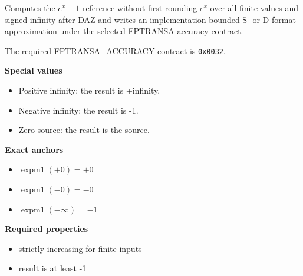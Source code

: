 Computes the $e^x - 1$ reference without first rounding $e^x$ over all finite values and signed infinity after DAZ and writes an implementation-bounded S- or D-format approximation under the selected FPTRANSA accuracy contract.

The required FPTRANSA\_ACCURACY contract is \texttt{0x0032}.

\textbf{Special values}\par
\begin{itemize}
\item Positive infinity: the result is +infinity.
\item Negative infinity: the result is -1.
\item Zero source: the result is the source.
\end{itemize}

\textbf{Exact anchors}\par
\begin{itemize}
\item $\operatorname{expm1}(+0) = +0$
\item $\operatorname{expm1}(-0) = -0$
\item $\operatorname{expm1}(-\infty) = -1$
\end{itemize}

\textbf{Required properties}\par
\begin{itemize}
\item strictly increasing for finite inputs
\item result is at least -1
\end{itemize}
